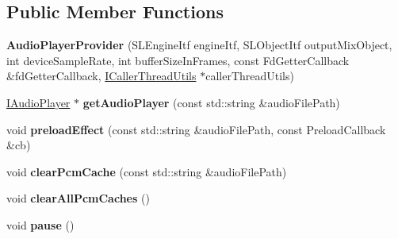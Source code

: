\subsection*{Public Member Functions}
\begin{DoxyCompactItemize}
\item 
\mbox{\label{classcocos2d_1_1experimental_1_1AudioPlayerProvider_a4e7bb5a8f1aa8ea2cb5d5e882e28590b}} 
{\bfseries Audio\+Player\+Provider} (S\+L\+Engine\+Itf engine\+Itf, S\+L\+Object\+Itf output\+Mix\+Object, int device\+Sample\+Rate, int buffer\+Size\+In\+Frames, const Fd\+Getter\+Callback \&fd\+Getter\+Callback, \hyperlink{classcocos2d_1_1experimental_1_1ICallerThreadUtils}{I\+Caller\+Thread\+Utils} $\ast$caller\+Thread\+Utils)
\item 
\mbox{\label{classcocos2d_1_1experimental_1_1AudioPlayerProvider_a87797364c252493f86df3ffbdbfbf326}} 
\hyperlink{classcocos2d_1_1experimental_1_1IAudioPlayer}{I\+Audio\+Player} $\ast$ {\bfseries get\+Audio\+Player} (const std\+::string \&audio\+File\+Path)
\item 
\mbox{\label{classcocos2d_1_1experimental_1_1AudioPlayerProvider_a0c2aaa4e310ba9dba72e83fcf62916a6}} 
void {\bfseries preload\+Effect} (const std\+::string \&audio\+File\+Path, const Preload\+Callback \&cb)
\item 
\mbox{\label{classcocos2d_1_1experimental_1_1AudioPlayerProvider_abfe61ba6c43fb326c4b8243c54ce2a7d}} 
void {\bfseries clear\+Pcm\+Cache} (const std\+::string \&audio\+File\+Path)
\item 
\mbox{\label{classcocos2d_1_1experimental_1_1AudioPlayerProvider_a1656059eaa22a224db8f0c2e5fe00808}} 
void {\bfseries clear\+All\+Pcm\+Caches} ()
\item 
\mbox{\label{classcocos2d_1_1experimental_1_1AudioPlayerProvider_a3e06f4560156f3d76490a6a4de971b49}} 
void {\bfseries pause} ()
\item 
\mbox{\label{classcocos2d_1_1experimental_1_1AudioPlayerProvider_a8b33890fc2268f40662dfa544fcb43ad}} 

\end{DoxyCompactItemize}
